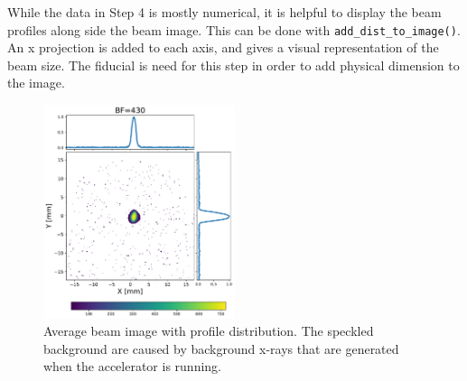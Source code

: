 While the data in Step 4 is mostly numerical, it is helpful to 
display the beam profiles along side the beam image. 
This can be done with \verb|add_dist_to_image()|. 
An x projection is added to each axis, and gives a visual representation of the beam size. 
The fiducial is need for this step in order to add physical dimension to the image.
\begin{figure}
	\centering
	\includegraphics[width=0.5\textwidth]{images/yag1_1nC_M260_BF430}
	\caption{Average beam image with profile distribution.
	The speckled background are caused by background x-rays that are 
	generated when the accelerator is running.}
\end{figure}


